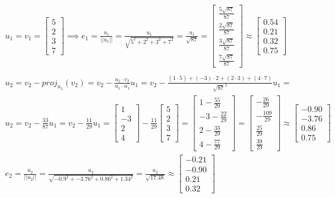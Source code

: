 \documentclass[a4paper,fleqn,12pt]{article}
\begin{document}
\begin{gather*}
u_1 = v_1 = \begin{bmatrix} 5 \\ 2 \\ 3 \\ 7   \end{bmatrix} \implies
e_1 = \frac{u_1}{|| u_1 ||} =
\frac{u_1}{\sqrt{5^2 + 2^2 + 3^2 + 7^2}} =
 \frac{u_1}{\sqrt{87}} = \begin{bmatrix} \frac{5\sqrt{87}}{87} \\ \frac{2\sqrt{87}}{87} \\ \frac{3\sqrt{87}}{87} \\ \frac{7\sqrt{87}}{87}   \end{bmatrix} \approx 
\begin{bmatrix} 0.54 \\ 0.21 \\ 0.32 \\ 0.75   \end{bmatrix} \\
 \\
u_2 = v_2 - proj_{u_1} (v_2) = v_2 - \frac{u_1 \cdot v_2}{ u_1 \cdot u_1}u_1 = v_2 - \frac{(1 \cdot 5) + (-3) \cdot 2 + (2 \cdot 3) + (4 \cdot 7)}{\sqrt{87}^2} u_1 = \\
u_2 = v_2 - \frac{33}{87} u_1 = v_2 - \frac{11}{29} u_1 = \begin{bmatrix} 1 \\ -3 \\2 \\ 4  \end{bmatrix} - \frac{11}{29} \begin{bmatrix} 5 \\ 2 \\ 3 \\ 7   \end{bmatrix} = \begin{bmatrix} 1 - \frac{55}{29} \\ -3 - \frac{22}{29} \\2 - \frac{33}{29} \\ 4 - \frac{77}{29} \end{bmatrix} =
\begin{bmatrix} -\frac{26}{29} \\ -\frac{109}{29} \\\frac{25}{29} \\ \frac{39}{29}  \end{bmatrix} \approx \begin{bmatrix} -0.90 \\ -3.76 \\ 0.86 \\ 0.75  \end{bmatrix} \\
e_2 = \frac{u_2}{|| u_2 ||} = \frac{u_2}{\sqrt{-0.9^2 + -3.76^2 + 0.86^2 + 1.34^2}} =
 \frac{u_2}{\sqrt{17.48}} \approx \begin{bmatrix} -0.21\\ -0.90 \\ 0.21 \\ 0.32   \end{bmatrix} \\
\end{gather*}
\end{document}
